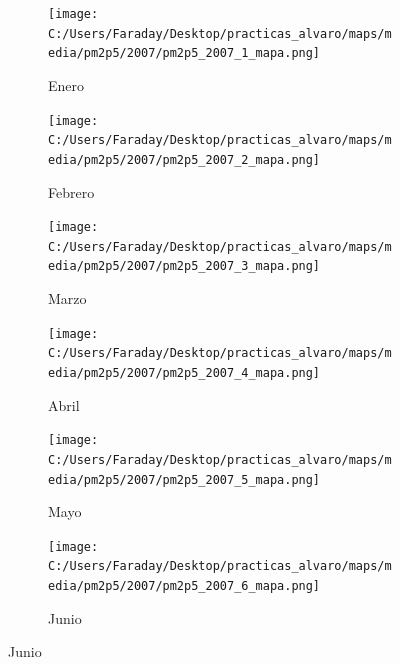 \documentclass[12pt]{article}
\begin{document}
\begin{figure}[H]
\centering
\begin{subfigure}[H]{0.15\textwidth}
\texttt{[image: C:/Users/Faraday/Desktop/practicas\_alvaro/maps/media/pm2p5/2007/pm2p5\_2007\_1\_mapa.png]}
\captionsetup{labelformat=empty}
\caption{Enero}
\label{fig:map-pm2p5-2007-1}
\end{subfigure}
%
\begin{subfigure}[H]{0.15\textwidth}
\texttt{[image: C:/Users/Faraday/Desktop/practicas\_alvaro/maps/media/pm2p5/2007/pm2p5\_2007\_2\_mapa.png]}
\captionsetup{labelformat=empty}
\caption{Febrero}
\label{fig:map-pm2p5-2007-2}
\end{subfigure}
%
\begin{subfigure}[H]{0.15\textwidth}
\texttt{[image: C:/Users/Faraday/Desktop/practicas\_alvaro/maps/media/pm2p5/2007/pm2p5\_2007\_3\_mapa.png]}
\captionsetup{labelformat=empty}
\caption{Marzo}
\label{fig:map-pm2p5-2007-3}
\end{subfigure}
%
\begin{subfigure}[H]{0.15\textwidth}
\texttt{[image: C:/Users/Faraday/Desktop/practicas\_alvaro/maps/media/pm2p5/2007/pm2p5\_2007\_4\_mapa.png]}
\captionsetup{labelformat=empty}
\caption{Abril}
\label{fig:map-pm2p5-2007-4}
\end{subfigure}
%
\begin{subfigure}[H]{0.15\textwidth}
\texttt{[image: C:/Users/Faraday/Desktop/practicas\_alvaro/maps/media/pm2p5/2007/pm2p5\_2007\_5\_mapa.png]}
\captionsetup{labelformat=empty}
\caption{Mayo}
\label{fig:map-pm2p5-2007-5}
\end{subfigure}
%
\begin{subfigure}[H]{0.15\textwidth}
\texttt{[image: C:/Users/Faraday/Desktop/practicas\_alvaro/maps/media/pm2p5/2007/pm2p5\_2007\_6\_mapa.png]}
\captionsetup{labelformat=empty}
\caption{Junio}
\label{fig:map-pm2p5-2007-6}
\end{subfigure}


\end{figure}
\end{document}
